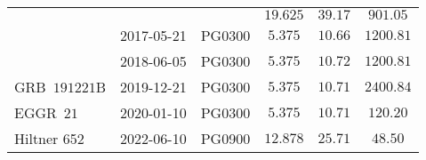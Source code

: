 \begin{table}[t]
\begin{tabular}{lccccc}
        &  &  & $19.625$ & $39.17$ & $901.05$ \\ %
        & 2017-05-21 & PG0300 & $5.375$ & $10.66$ & $1200.81$ \\ %
        & 2018-06-05 & PG0300 & $5.375$ & $10.72$ & $1200.81$ \\ %
        GRB~$191221$B & 2019-12-21 & PG0300 & $5.375$ & $10.71$ & $2400.84$ \\ %
        EGGR~$21$ & 2020-01-10 & PG0300 & $5.375$ & $10.71$ & $120.20$ \\ %
        Hiltner 652 & 2022-06-10 & PG0900 & $12.878$ & $25.71$ & $48.50$ \\
        \bottomrule
    \end{tabular}

\end{table}

